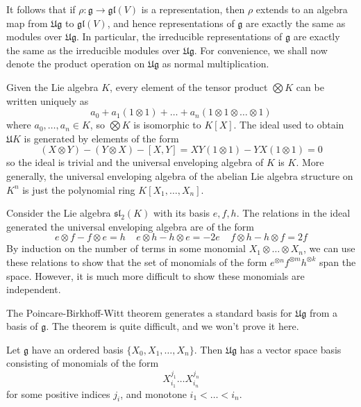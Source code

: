 It follows that if $\rho: \mathfrak{g} \to \mathfrak{gl}(V)$ is a representation, then $\rho$ extends to an algebra map from $\mathfrak{Ug}$ to $\mathfrak{gl}(V)$, and hence representations of $\mathfrak{g}$ are exactly the same as modules over $\mathfrak{Ug}$. In particular, the irreducible representations of $\mathfrak{g}$ are exactly the same as the irreducible modules over $\mathfrak{Ug}$. For convenience, we shall now denote the product operation on $\mathfrak{Ug}$ as normal multiplication.

\begin{example}
    Given the Lie algebra $K$, every element of the tensor product $\bigotimes K$ can be written uniquely as
    \[ a_0 + a_1 (1 \otimes 1) + \dots + a_n (1 \otimes 1 \otimes \dots \otimes 1) \]
    where $a_0, \dots, a_n \in K$, so $\bigotimes K$ is isomorphic to $K[X]$. The ideal used to obtain $\mathfrak{U} K$ is generated by elements of the form
    \[ (X \otimes Y) - (Y \otimes X) - [X,Y] = XY (1 \otimes 1) - YX (1 \otimes 1) = 0 \]
    so the ideal is trivial and the universal enveloping algebra of $K$ is $K$. More generally, the universal enveloping algebra of the abelian Lie algebra structure on $K^n$ is just the polynomial ring $K[X_1, \dots, X_n]$.
\end{example}

\begin{example}
    Consider the Lie algebra $\mathfrak{sl}_2(K)$ with its basis $e,f,h$. The relations in the ideal generated the universal enveloping algebra are of the form
    \[ e \otimes f - f \otimes e = h\ \ \ \ \ e \otimes h - h \otimes e = -2e\ \ \ \ \ f \otimes h - h \otimes f = 2f \]
    By induction on the number of terms in some monomial $X_1 \otimes \dots \otimes X_n$, we can use these relations to show that the set of monomials of the form $e^{\otimes n} f^{\otimes m} h^{\otimes k}$ span the space. However, it is much more difficult to show these monomials are independent.
\end{example}

The Poincare-Birkhoff-Witt theorem generates a standard basis for $\mathfrak{Ug}$ from a basis of $\mathfrak{g}$. The theorem is quite difficult, and we won't prove it here.

\begin{theorem}
    Let $\mathfrak{g}$ have an ordered basis $\{ X_0, X_1, \dots, X_n \}$. Then $\mathfrak{Ug}$ has a vector space basis consisting of monomials of the form
    \[ X_{i_1}^{j_1} \dots X_{i_n}^{j_n} \]
    for some positive indices $j_i$, and monotone $i_1 < \dots < i_n$.
\end{theorem}

